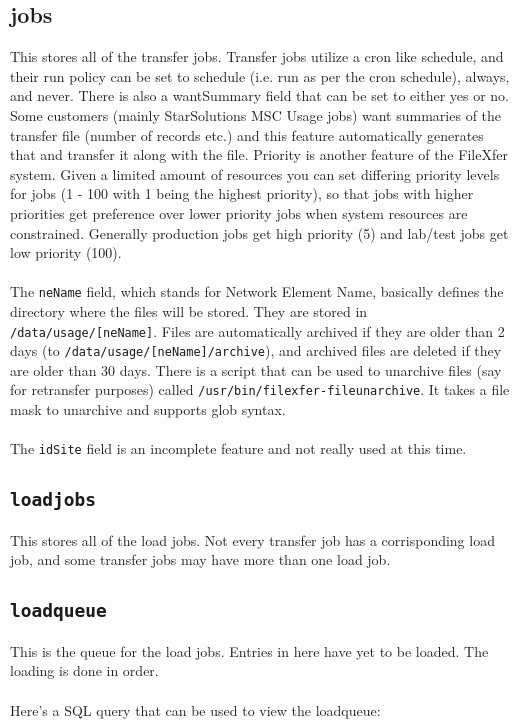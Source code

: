 \subsection{jobs}
This stores all of the transfer jobs.  Transfer jobs utilize a cron
like schedule, and their run policy can be set to schedule (i.e.
run as per the cron schedule), always, and never.  There is also
a wantSummary field that can be set to either yes or no.  Some
customers (mainly StarSolutions MSC Usage jobs) want summaries of
the transfer file (number of records etc.) and this feature
automatically generates that and transfer it along with the file.
Priority is another feature of the FileXfer system.  Given a limited
amount of resources you can set differing priority levels for jobs
(1 - 100 with 1 being the highest priority), so that jobs with
higher priorities get preference over lower priority jobs when
system resources are constrained.  Generally production jobs get
high priority (5) and lab/test jobs get low priority (100).\\
\\
The \texttt{neName} field, which stands for Network Element Name,
basically defines the directory where the files will be stored.
They are stored in \texttt{/data/usage/[neName]}.  Files are
automatically archived if they are older than 2 days (to
\texttt{/data/usage/[neName]/archive}), and archived files are
deleted if they are older than 30 days.  There is a script that
can be used to unarchive files (say for retransfer purposes)
called \texttt{/usr/bin/filexfer-fileunarchive}.  It takes a
file mask to unarchive and supports glob syntax.\\
\\
The \texttt{idSite} field is an incomplete feature and not
really used at this time.

\subsection{\texttt{loadjobs}}
This stores all of the load jobs.  Not every transfer job has
a corrisponding load job, and some transfer jobs may have more
than one load job.

\subsection{\texttt{loadqueue}}
This is the queue for the load jobs.  Entries in here have yet
to be loaded.  The loading is done in order.\\
\\
Here's a SQL query that can be used to view the loadqueue:

